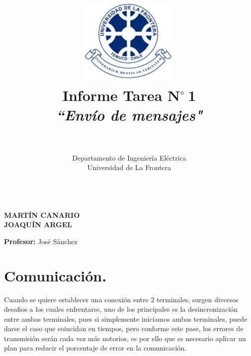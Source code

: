\documentclass[12pt,letterpaper]{article}
\renewcommand{\headrulewidth}{0pt}
\renewcommand{\footrulewidth}{0pt}
\renewcommand{\headrulewidth}{0pt}
\renewcommand{\footrulewidth}{0pt}
\newcommand{\grad}{$^{\circ}~$}
\begin{document}
\chead[]{}
\renewcommand{\headrulewidth}{0.5pt}

\cfoot[]{}
\rfoot[]{\thepage}
\renewcommand{\footrulewidth}{0.5pt}

\title{\includegraphics[width=4.7cm]{./img/logo.png} \\ \textbf{Informe Tarea N\grad 1}\\ %
{\small \textit{``Envío de mensajes"}}
}

\author{
\rule{10cm}{0.1mm} \\
Departamento de Ingeniería Eléctrica \\
\small Universidad de La Frontera \\
\rule{10cm}{0.1mm} 
}

\maketitle
{}
\vfill
	\begin{flushright}
	\textbf{\uppercase\expandafter{Martín Canario}}\\
	\textbf{\uppercase\expandafter{Joaquín Argel}}\\
	\end{flushright}
\vskip 0.1in
	\begin{flushleft}
	\textbf{Profesor:} José Sánchez \\
	\end{flushleft}
\lstset{language=C, breaklines=true, basicstyle=\scriptsize}
\newpage\normalsize


\section{Comunicación.}
Cuando se quiere establecer una conexión entre 2 terminales, surgen diversos desafios a los cuales enfrentarse, uno de los principales es la desincronización entre ambas terminales, pues si simplemente iniciamos ambas terminales, puede darse el caso que coincidan en tiempos, pero conforme este pase, los errores de transmisión serán cada vez más notorios, es por ello que es necesario aplicar un plan para reducir el porcentaje de error en la comunicación.
\end{document}
